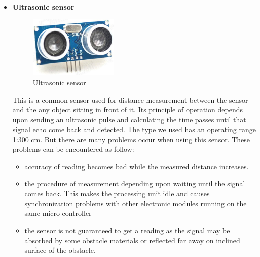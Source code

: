 \documentclass[12pt]{book}
\begin{document}
\begin{itemize}
	\item \textbf{Ultrasonic sensor}\\
		\begin{figure}[H]
		\centering
		\includegraphics[width =0.4\textwidth]{Fig/Electronics/ultrasonic.jpg}
		\caption{Ultrasonic sensor}
		\label{fig:ultrasonic}
	\end{figure}
	This is a common sensor used for distance measurement between the sensor and the any object sitting in front of it. Its principle of operation depends upon sending an ultrasonic pulse and calculating the time passes until that signal echo come back and detected. The type we used has an operating range 1:300 cm. But there are many problems occur when using this sensor. These problems can be encountered as follow:
	\begin{itemize}
		\item accuracy of reading becomes bad while the measured distance increases.
		\item the procedure of measurement depending upon waiting until the signal comes back. This makes the processing unit idle and causes synchronization problems with other electronic modules running on the same micro-controller
		\item the sensor is not guaranteed to get a reading as the signal may be absorbed by some obstacle materials or reflected far away on inclined surface of the obstacle.  
	\end{itemize} 


\end{itemize}
\end{document}
